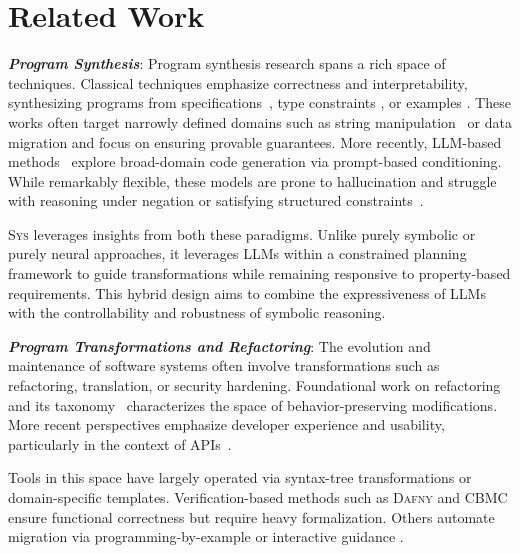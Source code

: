\documentclass[sigplan]{acmart}
\newcommand{\sys}{{\scshape Sys}\xspace}
\newcommand{\heading}[1]{\vspace{2pt}\noindent\textbf{\emph{#1}}:\enspace}
\begin{document}
\section{Related Work}

\heading{Program Synthesis}
Program synthesis research spans a rich space of techniques.
Classical techniques emphasize correctness and
interpretability, synthesizing programs from specifications~\cite{alur2013syntax, feser2015synthesizing, gulwani2011automating},
type constraints \cite{polikarpova2016program},
or examples \cite{jha2010oracle, raza2018disjunctive, singh2016blinkfill}.
These works often target narrowly
defined domains such as string manipulation~\cite{harp:ccs:2021} or data migration
\cite{yaghmazadeh2018automated} and focus on ensuring provable guarantees.
More recently, LLM-based methods~\cite{austin2021program, chen2021evaluating}
explore broad-domain code generation via prompt-based conditioning.
While remarkably flexible, these models are prone to hallucination and struggle
with reasoning under negation or satisfying structured constraints~\cite{xu2023llmfoolitselfpromptbased, wu2023deceptpromptexploitingllmdrivencode,jiang2024llmsdreamelephantswhen,hwang2024thinkpinkelephant}.

\sys leverages insights from both these paradigms.
Unlike purely symbolic or purely neural approaches, it leverages LLMs within a
constrained planning framework to guide transformations while remaining
responsive to property-based requirements. This hybrid design aims to combine
the expressiveness of LLMs with the controllability and robustness of symbolic
reasoning. %

\heading{Program Transformations and Refactoring}
The evolution and maintenance of software systems often involve transformations
such as refactoring, translation, or security hardening. Foundational work on
refactoring~\cite{Fowler99} and its taxonomy~\cite{Mens04} characterizes the
space of behavior-preserving modifications. More recent perspectives emphasize
developer experience and usability, particularly in the context of APIs~\cite{Myers16}.

Tools in this space have largely operated via syntax-tree transformations or
domain-specific templates. Verification-based methods such as \textsc{Dafny}
\cite{Leino10} and \textsc{CBMC} \cite{Clarke04} ensure functional correctness
but require heavy formalization.
Others automate migration via
programming-by-example or interactive guidance \cite{gulwani2017program, le2017interactive}.
\end{document}
